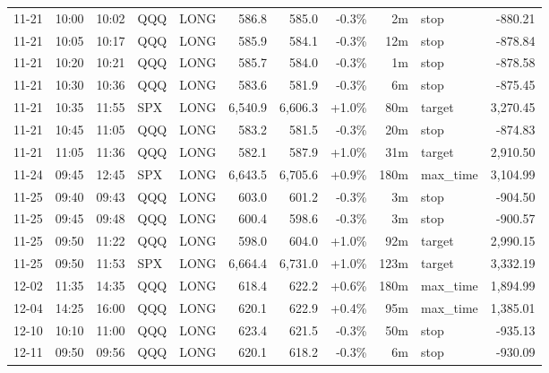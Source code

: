 \documentclass[11pt,a4paper,twoside]{article}
\begin{document}
\begin{center}
\begin{longtable}{>{\color{txtmain}}l l l l l r r r r >{\color{txtmain}}l r}
11-21 & 10:00 & 10:02 & QQQ & LONG & 586.8 & 585.0 & \textcolor{lossred}{-0.3\%} & 2m & stop & \textcolor{lossred}{-880.21} \\
11-21 & 10:05 & 10:17 & QQQ & LONG & 585.9 & 584.1 & \textcolor{lossred}{-0.3\%} & 12m & stop & \textcolor{lossred}{-878.84} \\
11-21 & 10:20 & 10:21 & QQQ & LONG & 585.7 & 584.0 & \textcolor{lossred}{-0.3\%} & 1m & stop & \textcolor{lossred}{-878.58} \\
11-21 & 10:30 & 10:36 & QQQ & LONG & 583.6 & 581.9 & \textcolor{lossred}{-0.3\%} & 6m & stop & \textcolor{lossred}{-875.45} \\
11-21 & 10:35 & 11:55 & SPX & LONG & 6,540.9 & 6,606.3 & \textcolor{wingreen}{+1.0\%} & 80m & target & \textcolor{wingreen}{3,270.45} \\
11-21 & 10:45 & 11:05 & QQQ & LONG & 583.2 & 581.5 & \textcolor{lossred}{-0.3\%} & 20m & stop & \textcolor{lossred}{-874.83} \\
11-21 & 11:05 & 11:36 & QQQ & LONG & 582.1 & 587.9 & \textcolor{wingreen}{+1.0\%} & 31m & target & \textcolor{wingreen}{2,910.50} \\
11-24 & 09:45 & 12:45 & SPX & LONG & 6,643.5 & 6,705.6 & \textcolor{wingreen}{+0.9\%} & 180m & max\_time & \textcolor{wingreen}{3,104.99} \\
11-25 & 09:40 & 09:43 & QQQ & LONG & 603.0 & 601.2 & \textcolor{lossred}{-0.3\%} & 3m & stop & \textcolor{lossred}{-904.50} \\
11-25 & 09:45 & 09:48 & QQQ & LONG & 600.4 & 598.6 & \textcolor{lossred}{-0.3\%} & 3m & stop & \textcolor{lossred}{-900.57} \\
11-25 & 09:50 & 11:22 & QQQ & LONG & 598.0 & 604.0 & \textcolor{wingreen}{+1.0\%} & 92m & target & \textcolor{wingreen}{2,990.15} \\
11-25 & 09:50 & 11:53 & SPX & LONG & 6,664.4 & 6,731.0 & \textcolor{wingreen}{+1.0\%} & 123m & target & \textcolor{wingreen}{3,332.19} \\
12-02 & 11:35 & 14:35 & QQQ & LONG & 618.4 & 622.2 & \textcolor{wingreen}{+0.6\%} & 180m & max\_time & \textcolor{wingreen}{1,894.99} \\
12-04 & 14:25 & 16:00 & QQQ & LONG & 620.1 & 622.9 & \textcolor{wingreen}{+0.4\%} & 95m & max\_time & \textcolor{wingreen}{1,385.01} \\
12-10 & 10:10 & 11:00 & QQQ & LONG & 623.4 & 621.5 & \textcolor{lossred}{-0.3\%} & 50m & stop & \textcolor{lossred}{-935.13} \\
12-11 & 09:50 & 09:56 & QQQ & LONG & 620.1 & 618.2 & \textcolor{lossred}{-0.3\%} & 6m & stop & \textcolor{lossred}{-930.09} \\

\end{longtable}
\end{center}
\end{document}
